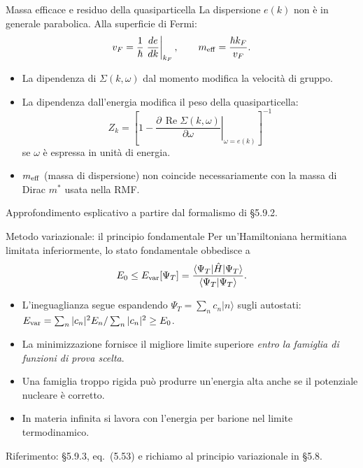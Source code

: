 \begin{frame}[t]{Massa efficace e residuo della quasiparticella}
\small
La dispersione $e(k)$ non è in generale parabolica. Alla superficie di Fermi:
\[
v_F=\frac{1}{\hbar}\left.\frac{de}{dk}\right|_{k_F},
\qquad
m_{\rm eff}=\frac{\hbar k_F}{v_F}.
\]
\begin{itemize}
\item La dipendenza di $\Sigma(k,\omega)$ dal momento modifica la velocità di gruppo.
\item La dipendenza dall'energia modifica il peso della quasiparticella:
\[
Z_k=\left[1-\left.
\frac{\partial\,\operatorname{Re}\Sigma(k,\omega)}{\partial\omega}
\right|_{\omega=e(k)}\right]^{-1}
\]
se $\omega$ è espressa in unità di energia.
\item $m_{\rm eff}$ (massa di dispersione) non coincide necessariamente con la massa di Dirac $m^*$ usata nella RMF.
\end{itemize}
{\footnotesize Approfondimento esplicativo a partire dal formalismo di §5.9.2.}
\end{frame}

\begin{frame}[t]{Metodo variazionale: il principio fondamentale}
\small
Per un'Hamiltoniana hermitiana limitata inferiormente, lo stato fondamentale obbedisce a
\[
E_0\leq E_{\rm var}[\Psi_T]
=\frac{\langle\Psi_T|\hat H|\Psi_T\rangle}
{\langle\Psi_T|\Psi_T\rangle}.
\]
\begin{itemize}
\item L'ineguaglianza segue espandendo $\Psi_T=\sum_n c_n|n\rangle$ sugli autostati: $E_{\rm var}=\sum_n |c_n|^2E_n/\sum_n|c_n|^2\ge E_0$.
\item La minimizzazione fornisce il migliore limite superiore \emph{entro la famiglia di funzioni di prova scelta}.
\item Una famiglia troppo rigida può produrre un'energia alta anche se il potenziale nucleare è corretto.
\item In materia infinita si lavora con l'energia per barione nel limite termodinamico.
\end{itemize}
{\footnotesize Riferimento: §5.9.3, eq.~(5.53) e richiamo al principio variazionale in §5.8.}
\end{frame}

